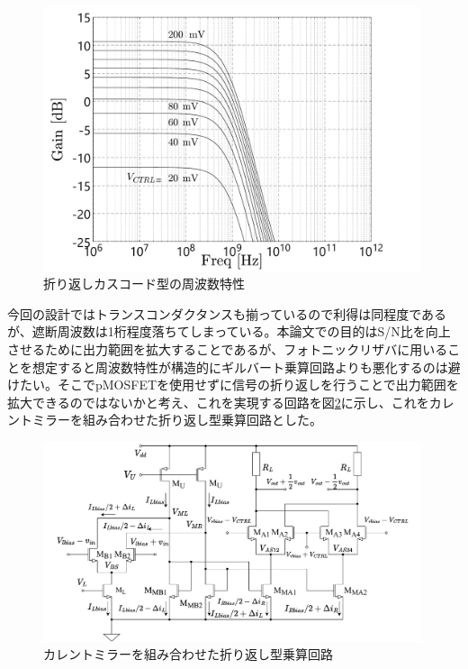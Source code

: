         \begin{figure}[!b]
            \centering
            \includegraphics[width=0.99\textwidth]{figures/chapter3/folded_ac.pdf}
            \caption{折り返しカスコード型の周波数特性}
            \label{fig:3_folded_gilbert_ac}
        \end{figure}
        \clearpage
        今回の設計ではトランスコンダクタンスも揃っているので利得は同程度であるが、遮断周波数は1桁程度落ちてしまっている。本論文での目的はS/N比を向上させるために出力範囲を拡大することであるが、フォトニックリザバに用いることを想定すると周波数特性が構造的にギルバート乗算回路よりも悪化するのは避けたい。そこでpMOSFETを使用せずに信号の折り返しを行うことで出力範囲を拡大できるのではないかと考え、これを実現する回路を図\ref{fig:3_folded_mirror_gilbert}に示し、これをカレントミラーを組み合わせた折り返し型乗算回路とした。\par
        \begin{figure}[!b]
            \begin{center}
                \includegraphics[width=0.99\textwidth]{figures/chapter3/NtoNFolded.pdf}
                \caption{カレントミラーを組み合わせた折り返し型乗算回路}
                \label{fig:3_folded_mirror_gilbert}
            \end{center}
        \end{figure}
